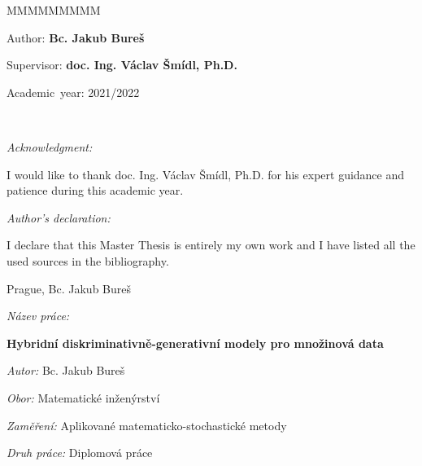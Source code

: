 \vfill{}

\begin{lyxlist}{MMMMMMMMM}
\begin{singlespace}
\item [{Author:}] \textbf{Bc. Jakub Bureš}
\item [{Supervisor:}] \textbf{doc. Ing. Václav Šmídl, Ph.D.}
\end{singlespace}

\begin{singlespace}
\item [{Academic~year:}] 2021/2022
\end{singlespace}
\end{lyxlist}

~\newpage{}

\noindent \emph{\Large{}Acknowledgment:}{\Large\par}

\noindent I would like to thank doc. Ing. Václav Šmídl, Ph.D.
for his expert guidance and patience during this academic year.

\vfill

\noindent \emph{\Large{}Author's declaration:}{\Large\par}

\noindent I declare that this Master Thesis is entirely
my own work and I have listed all the used sources in the bibliography.

\bigskip{}

\noindent Prague, \documentdate\hfill{}Bc. Jakub Bureš

\vspace{2cm}

\newpage{}

%
\begin{onehalfspace}
\noindent \emph{Název práce:}

\noindent \textbf{Hybridní diskriminativně-generativní modely pro množinová data}
\end{onehalfspace}

\bigskip{}

\noindent \emph{Autor:} Bc. Jakub Bureš

\bigskip{}

\noindent \emph{Obor:} Matematické inženýrství\bigskip{}

\noindent \emph{Zaměření:} Aplikované matematicko-stochastické metody

\bigskip{}

\noindent \emph{Druh práce:} Diplomová práce

